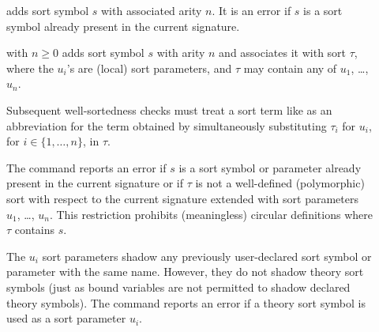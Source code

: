 \begin{description}

%
\item[]
\smallskip

%
\item[]
adds sort symbol $s$ with associated arity $n$.
It is an error if $s$ is a sort symbol  already present 
in the current signature.
\smallskip

%
\item[] with $n \geq 0$
adds sort symbol $s$ with arity $n$ and associates it with sort $\tau$,
where the $u_i$'s are (local) sort parameters, and $\tau$ may contain 
any of $u_1$, \dots, $u_n$.


Subsequent well-sortedness checks must treat a sort term like
as an abbreviation for the term obtained by simultaneously substituting
$\tau_i$ for $u_i$, for $i\in\{1,\ldots,n\}$, in $\tau$.

The command reports an error
if $s$ is a sort symbol or parameter already present in the current signature or
if $\tau$ is not a well-defined (polymorphic) sort 
with respect to the current signature extended with sort parameters 
$u_1$, \dots, $u_n$.
This restriction prohibits (meaningless) circular definitions
where $\tau$ contains $s$.
\begin{newver}
The $u_i$ sort parameters shadow any previously user-declared sort symbol
or parameter with the same name.
However, they do not shadow theory sort symbols (just as bound variables are
not permitted to shadow declared theory symbols).
The command reports an error if a theory sort
symbol is used as a sort parameter $u_i$.
\end{newver}


\end{description}
